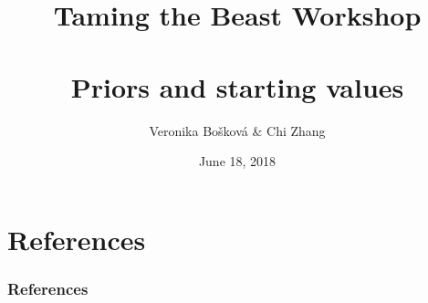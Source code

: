 \documentclass[xcolor=pdftex,dvipsnames,table,10pt]{beamer}
\author[]{Veronika Bo\v{s}kov\'{a} {\scriptsize \& Chi Zhang}}
\title[Taming the Beast]{Taming the Beast Workshop \\ \ \\ Priors and starting values}
\date{June 18, 2018}
\begin{document}
\begin{frame}
  \titlepage
\end{frame}



\section{References}
\begin{frame}[t,allowframebreaks]\frametitle{References}

\tiny
\end{frame}
\end{document}
